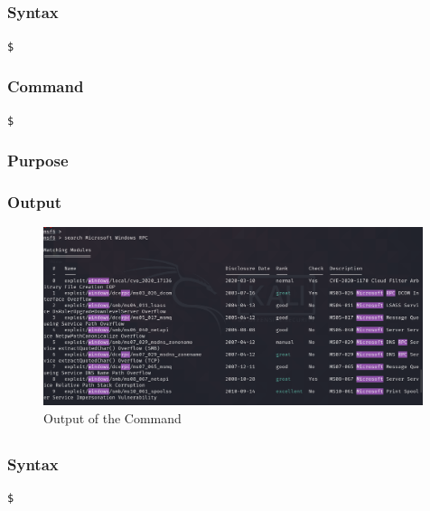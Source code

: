 \documentclass[11pt]{article}
\begin{document}
\subsection{}

\subsubsection*{Syntax}
\begin{verbatim}
$
\end{verbatim}

\subsubsection*{Command}
\begin{verbatim}
$
\end{verbatim}

\subsubsection*{Purpose}

\subsubsection*{Output}
\begin{figure}[H]
    \centering
    \includegraphics[width=0.99\textwidth]{a3_ss (19).png}
    \caption{Output of the Command}
\end{figure}
\subsection{}

\subsubsection*{Syntax}
\begin{verbatim}
$
\end{verbatim}
\end{document}
